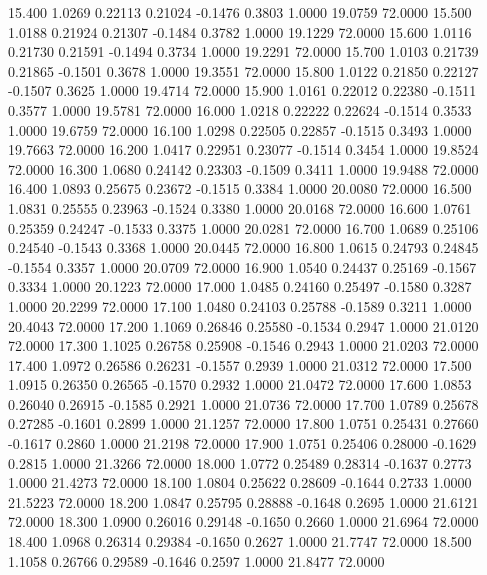   15.400   1.0269   0.22113   0.21024  -0.1476   0.3803   1.0000  19.0759  72.0000
  15.500   1.0188   0.21924   0.21307  -0.1484   0.3782   1.0000  19.1229  72.0000
  15.600   1.0116   0.21730   0.21591  -0.1494   0.3734   1.0000  19.2291  72.0000
  15.700   1.0103   0.21739   0.21865  -0.1501   0.3678   1.0000  19.3551  72.0000
  15.800   1.0122   0.21850   0.22127  -0.1507   0.3625   1.0000  19.4714  72.0000
  15.900   1.0161   0.22012   0.22380  -0.1511   0.3577   1.0000  19.5781  72.0000
  16.000   1.0218   0.22222   0.22624  -0.1514   0.3533   1.0000  19.6759  72.0000
  16.100   1.0298   0.22505   0.22857  -0.1515   0.3493   1.0000  19.7663  72.0000
  16.200   1.0417   0.22951   0.23077  -0.1514   0.3454   1.0000  19.8524  72.0000
  16.300   1.0680   0.24142   0.23303  -0.1509   0.3411   1.0000  19.9488  72.0000
  16.400   1.0893   0.25675   0.23672  -0.1515   0.3384   1.0000  20.0080  72.0000
  16.500   1.0831   0.25555   0.23963  -0.1524   0.3380   1.0000  20.0168  72.0000
  16.600   1.0761   0.25359   0.24247  -0.1533   0.3375   1.0000  20.0281  72.0000
  16.700   1.0689   0.25106   0.24540  -0.1543   0.3368   1.0000  20.0445  72.0000
  16.800   1.0615   0.24793   0.24845  -0.1554   0.3357   1.0000  20.0709  72.0000
  16.900   1.0540   0.24437   0.25169  -0.1567   0.3334   1.0000  20.1223  72.0000
  17.000   1.0485   0.24160   0.25497  -0.1580   0.3287   1.0000  20.2299  72.0000
  17.100   1.0480   0.24103   0.25788  -0.1589   0.3211   1.0000  20.4043  72.0000
  17.200   1.1069   0.26846   0.25580  -0.1534   0.2947   1.0000  21.0120  72.0000
  17.300   1.1025   0.26758   0.25908  -0.1546   0.2943   1.0000  21.0203  72.0000
  17.400   1.0972   0.26586   0.26231  -0.1557   0.2939   1.0000  21.0312  72.0000
  17.500   1.0915   0.26350   0.26565  -0.1570   0.2932   1.0000  21.0472  72.0000
  17.600   1.0853   0.26040   0.26915  -0.1585   0.2921   1.0000  21.0736  72.0000
  17.700   1.0789   0.25678   0.27285  -0.1601   0.2899   1.0000  21.1257  72.0000
  17.800   1.0751   0.25431   0.27660  -0.1617   0.2860   1.0000  21.2198  72.0000
  17.900   1.0751   0.25406   0.28000  -0.1629   0.2815   1.0000  21.3266  72.0000
  18.000   1.0772   0.25489   0.28314  -0.1637   0.2773   1.0000  21.4273  72.0000
  18.100   1.0804   0.25622   0.28609  -0.1644   0.2733   1.0000  21.5223  72.0000
  18.200   1.0847   0.25795   0.28888  -0.1648   0.2695   1.0000  21.6121  72.0000
  18.300   1.0900   0.26016   0.29148  -0.1650   0.2660   1.0000  21.6964  72.0000
  18.400   1.0968   0.26314   0.29384  -0.1650   0.2627   1.0000  21.7747  72.0000
  18.500   1.1058   0.26766   0.29589  -0.1646   0.2597   1.0000  21.8477  72.0000
